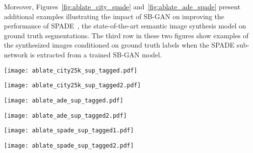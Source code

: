 \documentclass[10pt,twocolumn,letterpaper]{article}
\begin{document}
Moreover, Figures~\ref{fig:ablate_city_spade} and~\ref{fig:ablate_ade_spade} present additional examples illustrating the impact of SB-GAN on improving the performance of SPADE~\cite{SPADE}, the state-of-the-art semantic image synthesis model on ground truth segmentations. The third row in these two figures show examples of the synthesized images conditioned on ground truth labels when the SPADE sub-network is extracted from a trained SB-GAN model.



\begin{figure*}[t!]
\centering
\texttt{[image: ablate\_city25k\_sup\_tagged.pdf]}
\caption{Segmentations and their corresponding images synthesized by SB-GAN trained on the Cityscapes-25K dataset.}
\label{fig:ablate_city}
\end{figure*}

\begin{figure*}[t!]
\centering
\texttt{[image: ablate\_city25k\_sup\_tagged2.pdf]}
\caption{Segmentations and their corresponding images synthesized by SB-GAN trained on the Cityscapes-25K dataset.}
\label{fig:ablate_city2}
\end{figure*}


\begin{figure*}[t!]
\centering
\texttt{[image: ablate\_ade\_sup\_tagged.pdf]}
\caption{Segmentations and their corresponding images synthesized by SB-GAN trained on the ADE-Indoor dataset.}
\label{fig:ablate_ade}
\end{figure*}


\begin{figure*}[t!]
\centering
\texttt{[image: ablate\_ade\_sup\_tagged2.pdf]}
\caption{Segmentations and their corresponding images synthesized by SB-GAN trained on the ADE-Indoor dataset.}
\label{fig:ablate_ade2}
\end{figure*}


\begin{figure*}[!t]
\centering
\texttt{[image: ablate\_spade\_sup\_tagged1.pdf]}
\caption{The effect of SB-GAN on improving the performance of the state-of-the-art semantic image synthesis model (SPADE) on ground truth segmentations of Cityscapes-25K validation set. For SB-GAN, we train the entire model end-to-end, extract the trained SPADE sub-network, and synthesize samples conditioned on the ground truth labels.}
\label{fig:ablate_city_spade}
\end{figure*}

\begin{figure*}[t!]
\centering
\texttt{[image: ablate\_spade\_sup\_tagged2.pdf]}
\caption{The effect of SB-GAN on improving the performance of the state-of-the-art semantic image synthesis model (SPADE) on ground truth segmentations of ADE-Indoor validation set. For SB-GAN, we train the entire model end-to-end, extract the trained SPADE sub-network, and synthesize samples conditioned on the ground truth labels.}
\label{fig:ablate_ade_spade}
\end{figure*}
\end{document}
